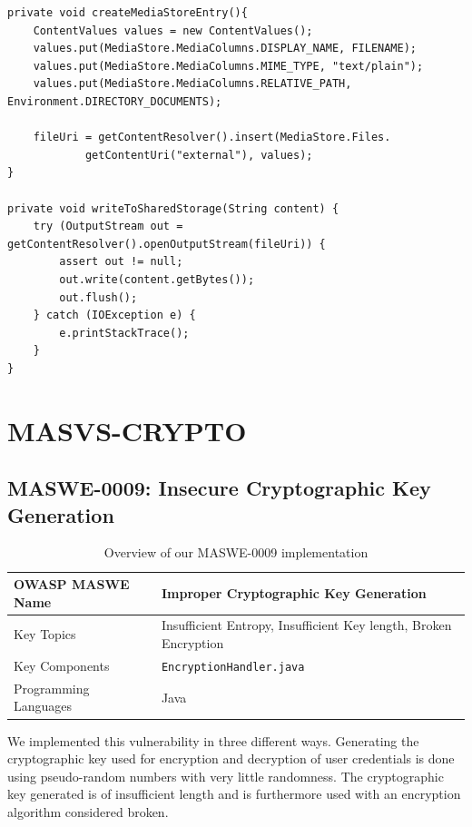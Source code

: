 \begin{lstlisting}[style=JavaStyle, float=tbh, mathescape=true, captionpos=b, caption={Creating a \texttt{MediaStore} entry and writing user credentials to it}, label=lst:Maswe0007CreateMediaStoreEntry]
private void createMediaStoreEntry(){
    ContentValues values = new ContentValues();
    values.put(MediaStore.MediaColumns.DISPLAY_NAME, FILENAME);
    values.put(MediaStore.MediaColumns.MIME_TYPE, "text/plain");
    values.put(MediaStore.MediaColumns.RELATIVE_PATH, Environment.DIRECTORY_DOCUMENTS);

    fileUri = getContentResolver().insert(MediaStore.Files.
            getContentUri("external"), values);
}

private void writeToSharedStorage(String content) {
    try (OutputStream out = getContentResolver().openOutputStream(fileUri)) {
        assert out != null;
        out.write(content.getBytes());
        out.flush();
    } catch (IOException e) {
        e.printStackTrace();
    }
}
\end{lstlisting}


\clearpage
\section{MASVS-CRYPTO}

\subsection{MASWE-0009: Insecure Cryptographic Key Generation}

\begin{table}[H]
\centering
\renewcommand{\arraystretch}{1.3}
\begin{tabular}{p{5cm} p{8cm}} 
\toprule
OWASP MASWE Name & Improper Cryptographic Key Generation \\ 
\midrule
Key Topics & Insufficient Entropy, Insufficient Key length, Broken Encryption \\
Key Components & \texttt{EncryptionHandler.java} \\
Programming Languages & Java \\ 
\bottomrule
\end{tabular}
\caption{Overview of our MASWE-0009 implementation}
\label{tab:maswe-0009}
\end{table}

We implemented this vulnerability in three different ways. Generating the cryptographic key used for encryption and decryption of user credentials is done using pseudo-random numbers with very little randomness. The cryptographic key generated is of insufficient length and is furthermore used with an encryption algorithm considered broken.

